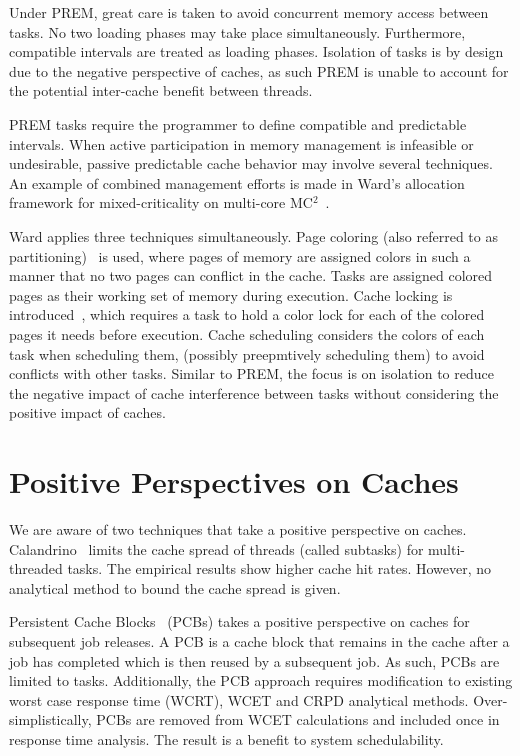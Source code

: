 Under PREM, great care is taken to avoid concurrent memory access
between tasks. No two loading phases may take place simultaneously. 
Furthermore, compatible intervals are treated as loading
phases. Isolation of tasks is by design due to the negative
perspective of caches, as such PREM is unable to account for the
potential inter-cache benefit between threads.

\newcommand{\mcc}{MC${^2}$}

PREM tasks require the programmer to define compatible and predictable
intervals. When active participation in memory management is
infeasible or undesirable, passive predictable cache behavior may
involve several techniques. An example of combined management efforts
is made in Ward's allocation framework for mixed-criticality on
multi-core \mcc~\cite{Ward:2013}.

Ward applies three techniques simultaneously. Page
coloring (also referred to as partitioning)~\cite{Bui:2008} is used,
where pages of memory are assigned colors in such a manner that no two
pages can conflict in the cache. Tasks are assigned colored pages as
their working set of memory during execution. Cache locking is
introduced~\cite{Ward:2013}, which requires a task to hold a color
lock for each of the colored pages it needs before execution. Cache
scheduling considers the colors of each task when scheduling them,
(possibly preepmtively scheduling them) to avoid conflicts with other
tasks. Similar to PREM, the focus is on isolation to reduce the
negative impact of cache interference between tasks without
considering the positive impact of caches.

\section{Positive Perspectives on Caches}

We are aware of two techniques that take a positive perspective on
caches. Calandrino~\cite{Calandrino:2009} limits the cache spread of
threads (called subtasks) for multi-threaded tasks. The empirical
results show higher cache hit rates. However, no
analytical method to bound the cache spread is given.

Persistent Cache Blocks~\cite{Rashid:2016,Rashid:2017} (PCBs) takes a
positive perspective on caches for subsequent job releases. A PCB is a
cache block that remains in the cache after a job has completed which
is then reused by a subsequent job. As such, PCBs are limited to
tasks. Additionally, the PCB approach requires modification to 
existing worst case response time (WCRT), WCET and CRPD analytical
methods. Over-simplistically, PCBs are removed from WCET calculations
and included once in response time analysis. The result is a
benefit to system schedulability.



